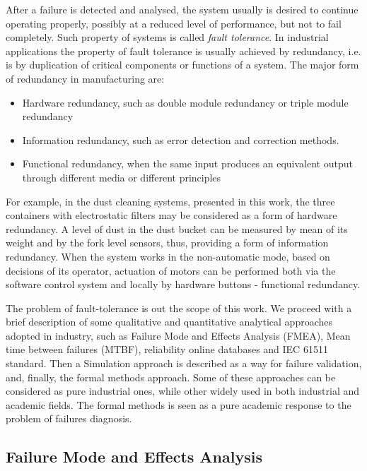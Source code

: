 After a failure is detected and analysed, the system usually is desired to
continue operating properly, possibly at a reduced level of performance, but not
to fail completely. Such property of systems is called \emph{fault tolerance}.
In industrial applications the property of fault tolerance is usually achieved
by redundancy, i.e. is by duplication of critical components or functions of a
system. The major form of redundancy in manufacturing are:
\begin{itemize}
  \item Hardware redundancy, such as double module redundancy or triple module
  redundancy
  \item Information redundancy, such as error detection and correction methods. 
  \item Functional redundancy, when the same input produces an equivalent
  output through different media or different principles
\end{itemize}

For example, in the dust cleaning systems, presented in this work, the three
containers with electrostatic filters may be considered as a form of hardware
redundancy. A level of dust in the dust bucket can be measured by mean of its
weight and by the fork level sensors, thus, providing a form of information
redundancy. When the system works in the non-automatic mode, based on decisions
of its operator, actuation of motors can be performed both via the
software control system and locally by hardware buttons - functional
redundancy. 

The problem of fault-tolerance is out the scope of this work. We proceed with a
brief description of some qualitative and quantitative analytical approaches
adopted in industry, such as Failure Mode and Effects Analysis (FMEA), Mean time
between failures (MTBF), reliability online databases and IEC 61511
standard. Then a Simulation approach is described as a way for failure
validation, and, finally, the formal methods approach. Some of these approaches
can be considered as pure industrial ones, while other widely used in both
industrial and academic fields. The formal methods is seen as a pure academic
response to the problem of failures diagnosis.


\subsection{Failure Mode and Effects Analysis}

